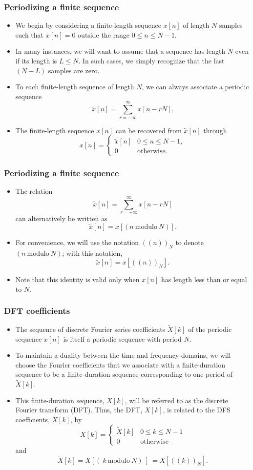 \begin{frame}
\frametitle{Periodizing a finite sequence}
\begin{itemize}
\item We begin by considering a finite-length sequence $x[n]$ of length $N$ samples such that $x[n]=0$ outside the range $0\leq n \leq N-1$.
\item In many instances, we will want to assume that a sequence has length $N$ even if its length is $L \leq N$. In such cases, we simply recognize that the last $(N-L)$ samples are zero.
\item To each finite-length sequence of length $N$, we can always associate a periodic sequence
$$
\tilde{x}[n]=\sum_{r=-\infty}^{\infty} x[n-rN].
$$
\item The finite-length sequence $x[n]$ can be recovered from $\tilde{x}[n]$ through
\[
x[n]=
\begin{cases}
\tilde{x}[n] & 0\leq n \leq N-1,\\
0 & \text{otherwise}.
\end{cases}
\]
\end{itemize}
\end{frame}

\begin{frame}
\frametitle{Periodizing a finite sequence}
\begin{itemize}
\item The relation
$$
\tilde{x}[n]=\sum_{r=-\infty}^{\infty} x[n-rN]
$$
can alternatively be written as
$$
\tilde{x}[n]=x[(n\ \mathrm{modulo}\ N)].
$$
\item For convenience, we will use the notation $((n))_{N}$ to denote $(n\ \mathrm{modulo}\ N)$; with this notation,
$$
\tilde{x}[n]=x[((n))_{N}].
$$
\item Note that this identity is valid only when $x[n]$ has length less than or equal to $N$.
\end{itemize}
\end{frame}

\begin{frame}
\frametitle{DFT coefficients}
\begin{itemize}
\item The sequence of discrete Fourier series coefficients $\tilde{X}[k]$ of the periodic sequence $\tilde{x}[n]$ is itself a periodic sequence with period $N$.
\item To maintain a duality between the time and frequency domains, we will choose the Fourier coefficients that we associate with a finite-duration sequence to be a finite-duration sequence corresponding to one period of $\tilde{X}[k]$.
\item This finite-duration sequence, $X[k]$, will be referred to as the discrete Fourier transform (DFT). Thus, the DFT, $X[k]$, is related to the DFS coefficients, $\tilde{X}[k]$, by
$$
X[k]=
\begin{cases}
\tilde{X}[k] & 0 \leq k \leq N-1 \\
0 & \text{otherwise}
\end{cases}
$$
and
$$
\tilde{X}[k]=X[(\ k\ \mathrm{modulo}\ N)\ ]\ =X[((k))_{N}].
$$
\end{itemize}
\end{frame}

